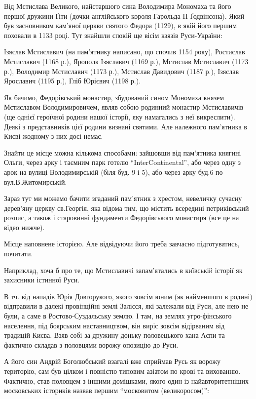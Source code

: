 Від Мстислава Великого, найстаршого сина Володимира Мономаха та його першої
дружини Ґіти (дочки англійського короля Гарольда II Ґодвінсона). Який був
засновником кам'яної церкви святого Федора (1129), в якій його першим поховали
в 1133 році. Тут знайшли спокій ще вісім кзязів Руси-України: 

Ізяслав Мстиславич (на пам’ятнику написано, що спочив 1154 року), Ростислав
Мстиславич (1168 р.), Ярополк Ізяславич (1169 р.), Мстислав Мстиславич (1173
р.), Володимир Мстиславич (1173 р.), Мстислав Давидович (1187 р.), Ізяслав
Ярославич (1195 р.), Гліб Юрієвич (1198 р.). 

Як бачимо, Федорівський монастир, збудований сином Мономаха князем Мстиславом
Володимировичем, являв собою родинний монастир Мстиславичів (ще однієї
героїчної родини нашої історії, яку намагались з неї викреслити). Деякі з
представників цієї родини визнані святими. Але належного пам’ятника в Києві
жодному з них досі немає.

Знайти це місце можна кількома способами: зайшовши від пам’ятника княгині
Ольги, через арку і таємним парк готелю \enquote{InterContinental}, або через
одну з арок на вулиці Володимирській (біля буд. 9 і 5), або через арку буд.6 по
вул.В.Житомирській. 

Зараз тут ми можемо бачити згаданий пам’ятник з хрестом, невеличку сучасну
дерев’яну церкву св.Георгія, яка відома тим, що містить всередині петриківський
розпис, а також і старовинні фундаменти Федорівського монастиря (все це на
відео нижче). 

Місце наповнене історією. Але відвідуючи його треба завчасно підготуватись,
почитати.

Наприклад, хоча б про те, що Мстиславичі запам'ятались в київській історії як
захисники істинної Руси. 

В тч. від нападів Юрія Довгорукого, якого зовсім юним (як найменшого в родині)
відправили в далекі провінційні землі Залісся, які залежали від Руси, але нею
не були, а саме в Ростово-Суздальську землю. І там, на землях угро-фінського
населення, під боярським наставництвом, він виріс зовсім відірваним від
традицій Києва. Взяв собі за дружину доньку половецького хана Аєпи та фактично
складав з половцями ворожу опозицію до Руси. 

А його син Андрій Боголюбський взагалі вже сприймав Русь як ворожу територію,
сам був цілком і повністю типовим азіатом по крові та вихованню. Фактично, став
половцем з іншими домішками, якого один із найавторитетніших московських
істориків назвав першим \enquote{московитом (великоросом)}: 

